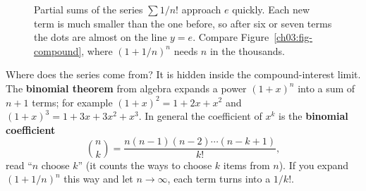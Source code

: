 \begin{figure}[htbp]
\centering
{}
\caption{Partial sums of the series $\sum 1/n!$ approach $e$ quickly. Each new term is much smaller than the one before, so after six or seven terms the dots are almost on the line $y=e$. Compare Figure~\ref{ch03:fig-compound}, where $(1+1/n)^n$ needs $n$ in the thousands.}
\label{ch03:fig-series}
\end{figure}

Where does the series come from? It is hidden inside the compound-interest limit. The \textbf{binomial theorem} from algebra expands a power $(1+x)^n$ into a sum of $n+1$ terms; for example $(1+x)^2=1+2x+x^2$ and $(1+x)^3=1+3x+3x^2+x^3$. In general the coefficient of $x^k$ is the \textbf{binomial coefficient}
\[
\binom{n}{k}=\frac{n(n-1)(n-2)\cdots(n-k+1)}{k!},
\]
read ``$n$ choose $k$'' (it counts the ways to choose $k$ items from $n$). If you expand $(1+1/n)^n$ this way and let $n\to\infty$, each term turns into a $1/k!$.

